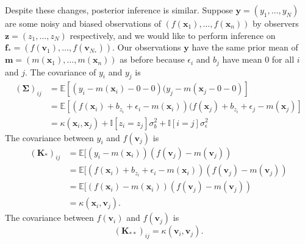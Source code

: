 Despite these changes, posterior inference is similar.
Suppose $\mathbf{y} = (y_1, \dots, y_N)$ are some noisy and biased observations of $(f(\mathbf{x}_1), \dots, f(\mathbf{x}_n))$
by observers $\mathbf{z} = (z_1, \ldots, z_N)$ respectively,
and we would like to perform inference on $\mathbf{f}_* = (f(\mathbf{v}_1), \dots, f(\mathbf{v}_{N_{*}}))$.
Our observations $\mathbf{y}$ have the same prior mean of $\mathbf{m} = (m(\mathbf{x}_1), \dots, m(\mathbf{x}_n))$ as before because $\epsilon_i$ and $b_j$ have mean 0 for all $i$ and $j$.
The covariance of $y_i$ and $y_{j}$ is
\begin{align*}
    (\mathbf{\Sigma})_{ij}
    &= \mathbb{E}[(y_i - m(\mathbf{x}_i) - 0 - 0)(y_j - m(\mathbf{x}_j - 0 - 0)] \\
    &= \mathbb{E}[(f(\mathbf{x}_i) + b_{z_i} + \epsilon_i - m(\mathbf{x}_i))(f(\mathbf{x}_j) + b_{z_i} + \epsilon_j - m(\mathbf{x}_j)] \\
    &= \kappa(\mathbf{x}_i, \mathbf{x}_{j}) + \mathbb{I}[z_i = z_{j}] \sigma^2_b + \mathbb{I}[i = j]\sigma^2_{ \epsilon }
\end{align*}
The covariance between $y_i$ and $f(\mathbf{v}_j)$ is
\begin{align*}
    (\mathbf{K}_{*})_{ij}
    &= \mathbb{E}[ (y_i - m(\mathbf{x}_i))(f(\mathbf{v}_j) - m(\mathbf{v}_j)) \\
    &= \mathbb{E}[ (f(\mathbf{x}_i) + b_{z_i} + \epsilon_i - m(\mathbf{x}_i))(f(\mathbf{v}_j) - m(\mathbf{v}_j)) \\
    &= \mathbb{E}[ (f(\mathbf{x}_i) - m(\mathbf{x}_i))(f(\mathbf{v}_j) - m(\mathbf{v}_j)) \\
    &= \kappa(\mathbf{x}_i, \mathbf{v}_j).
\end{align*}
The covariance between $f(\mathbf{v}_i)$ and $f(\mathbf{v}_j)$ is
\begin{equation*}
    (\mathbf{K}_{* *})_{ij} = \kappa(\mathbf{v}_i, \mathbf{v}_j).
\end{equation*}

